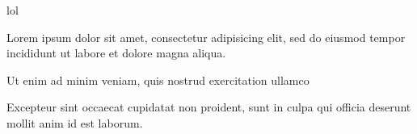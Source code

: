 


\nodetreeprocessoptions

\nodetreeregister lol \nodetreeunregister

Lorem ipsum dolor sit amet, consectetur adipisicing elit, sed do eiusmod
tempor incididunt ut labore et dolore magna aliqua.

 Ut enim ad minim veniam,
quis nostrud exercitation ullamco


Excepteur sint occaecat cupidatat non
proident, sunt in culpa qui officia deserunt mollit anim id est laborum.

\bye
